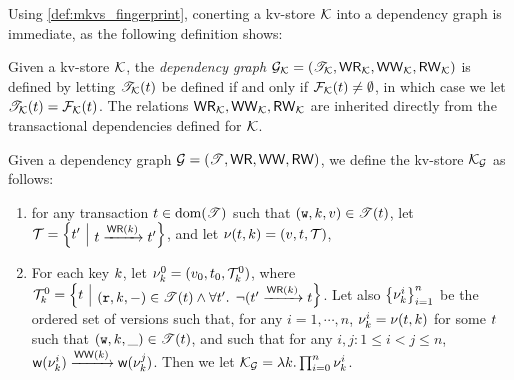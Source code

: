 Using \cref{def:mkvs_fingerprint}, conerting a kv-store $\mathcal{K}$  into a dependency graph is immediate, as the following 
definition shows: 

\begin{definition}
\label{def:kv2graph}
Given a kv-store $\mathcal{K}$, the \emph{dependency graph} $\mathcal{G}_{\mathcal{K}} = (\mathscr{T}_{\mathcal{K}}, \mathsf{WR}_{\mathcal{K}}, 
\mathsf{WW}_{\mathcal{K}}, \mathsf{RW}_{\mathcal{K}})$ is defined by letting  $\mathscr{T}_{\mathcal{K}}(t)$ be defined if and only if
$\mathcal{F}_{\mathcal{K}}(t) \neq \emptyset$, in which case we let $\mathscr{T}_{\mathcal{K}}(t) = \mathcal{F}_{\mathcal{K}}(t)$. 
The relations $\mathsf{WR}_{\mathcal{K}}, \mathsf{WW}_{\mathcal{K}}, \mathsf{RW}_{\mathcal{K}}$ are inherited directly from the transactional 
dependencies defined for $\mathcal{K}$.
\end{definition}

\begin{definition}
\label{def:dependency-to-kv-store}
Given a dependency graph $\mathcal{G} = (\mathscr{T}, \mathsf{WR}, \mathsf{WW}, \mathsf{RW})$, we define the kv-store $\mathcal{K}_{\mathcal{G}}$ as follows: 
\begin{enumerate}
\item for any transaction $t \in \operatorname{dom}(\mathscr{T})$ such that $(\textnormal{\texttt w}, k, v) \in \mathscr{T}(t)$, 
    let $\txidset = \Set{ \txid' }[ \txid \toEDGE{\WR(\key)} \txid']$, and let $\nu(t, k) = (v, t, \mathcal{T})$, 
\item For each key $k$, let $\nu_{k}^{0} = (v_0, t_0, \mathcal{T}_k^{0})$, where $\txidset_{k}^{0} = \Set{ \txid }[ (\otR, \key, \stub) \in 
\TtoOp{T}(\txid) \land \fora{ \txid' } \neg( \txid' \toEDGE{\WR(\key)} \txid ]$. 
Let also $\Set{ \ver_{\key}^{i} }_{i = 1}^{n}$ be the ordered set of versions such that, for any 
$i=1,\cdots,n$, $\nu_{k}^{i} = \nu(t, k)$ for some $t$ such that $(\textnormal{\texttt w}, k, \_) \in \mathscr{T}(t)$, 
and such that for any $i, j: 1 \leq i < j \leq n$, $\wtOf(\ver_{\key}^{i}) \toEDGE{\WW(\key)} \wtOf(\ver_{\key}^{j})$. 
Then we let $\mathcal{K}_{\mathcal{G}}= \lambda k. \prod_{i=0}^{n} \nu_{k}^{i}$.
\end{enumerate}
\end{definition}

